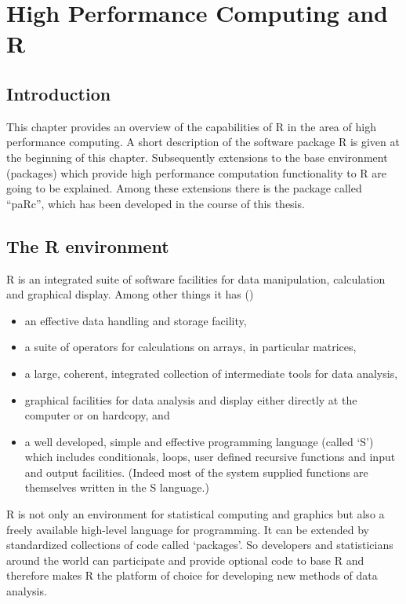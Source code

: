 \chapter{High Performance Computing and R}
\label{chap:Rhpc}
\section{Introduction}

This chapter provides an overview of the capabilities of R in the area
of high performance computing. A short description of the
software package R is given at the beginning of this
chapter. Subsequently extensions to the base environment 
(packages) which provide high performance computation functionality to
R are going to be explained. Among these extensions there is the
package called ``paRc'', which has been developed in the course of
this thesis.

\section{The R environment}

R is an integrated suite of software facilities for data manipulation,
calculation and graphical display. Among other things it has (\cite{IntrotoR})
\begin{itemize}
\item an effective data handling and storage facility,
\item a suite of operators for calculations on arrays, in particular matrices,
\item a large, coherent, integrated collection of intermediate tools
  for data analysis,
\item graphical facilities for data analysis and display either
  directly at the computer or on hardcopy, and
\item a well developed, simple and effective programming language
  (called `S') which includes conditionals, loops, user defined
  recursive functions and input and output facilities. (Indeed most of
  the system supplied functions are themselves written in the S
  language.)
\end{itemize}

R is not only an environment for statistical computing and graphics
but also a freely available high-level language for programming. It
can be extended by standardized collections of code called
`packages'. So developers and statisticians around the world can
participate and provide optional code to base R and therefore makes R
the platform of choice for developing new methods of data analysis. 

